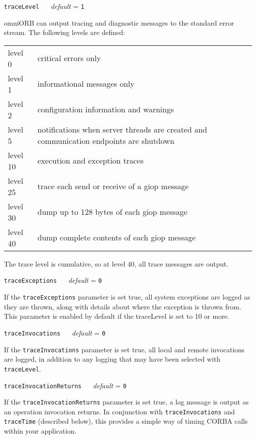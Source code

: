 \documentclass[11pt,twoside,a4paper]{book}
\makeatletter
\newcommand{\code}[1]{\texttt{#1}}
\newcommand{\confopt}[2]
  {\vspace{\baselineskip}\par\noindent\code{#1} ~~ \textit{default} =
   \code{#2}}
\renewcommand{\confopt}[2]
  {\vspace{\baselineskip}\par\noindent\code{#1} ~~ \textit{default} =
   \code{#2}\\[-1ex]\@afterheading}
\makeatother
\begin{document}
\confopt{traceLevel}{1}

omniORB can output tracing and diagnostic messages to the standard
error stream. The following levels are defined:

\vspace{\baselineskip}

\begin{tabular}{lp{}}

level 0      & critical errors only\\
level 1      & informational messages only\\
level 2      & configuration information and warnings\\

level 5      & notifications when server threads are
               created and communication endpoints are shutdown\\

level 10     & execution and exception traces\\
level 25     & trace each send or receive of a giop message\\
level 30     & dump up to 128 bytes of each giop message\\
level 40     & dump complete contents of each giop message\\
\end{tabular}

\vspace{\baselineskip}

\noindent The trace level is cumulative, so at level 40, all trace
messages are output.


\confopt{traceExceptions}{0}

If the \code{traceExceptions} parameter is set true, all system
exceptions are logged as they are thrown, along with details about
where the exception is thrown from. This parameter is enabled by
default if the traceLevel is set to 10 or more.


\confopt{traceInvocations}{0}

If the \code{traceInvocations} parameter is set true, all local and
remote invocations are logged, in addition to any logging that may
have been selected with \code{traceLevel}.


\confopt{traceInvocationReturns}{0}

If the \code{traceInvocationReturns} parameter is set true, a log
message is output as an operation invocation returns. In conjunction
with \code{traceInvocations} and \code{traceTime} (described below),
this provides a simple way of timing CORBA calls within your
application.
\end{document}
